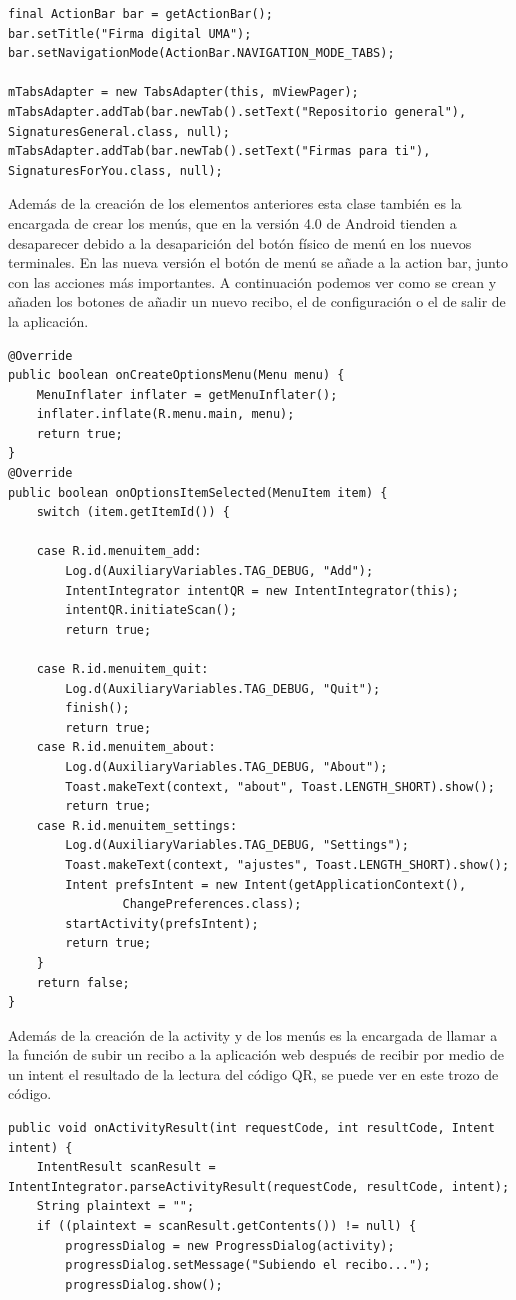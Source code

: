\begin{itemize}
\begin{lstlisting}[style=Java]
final ActionBar bar = getActionBar();
bar.setTitle("Firma digital UMA");
bar.setNavigationMode(ActionBar.NAVIGATION_MODE_TABS);

mTabsAdapter = new TabsAdapter(this, mViewPager);
mTabsAdapter.addTab(bar.newTab().setText("Repositorio general"), SignaturesGeneral.class, null);
mTabsAdapter.addTab(bar.newTab().setText("Firmas para ti"), SignaturesForYou.class, null);
\end{lstlisting}

Además de la creación de los elementos anteriores esta clase también es la encargada de crear los menús, que en la versión 4.0 de Android tienden a desaparecer debido a la desaparición del botón físico de menú en los nuevos terminales. En las nueva versión el botón de menú se añade a la action bar, junto con las acciones más importantes. A continuación podemos ver como se crean y añaden los botones de añadir un nuevo recibo, el de configuración o el de salir de la aplicación.

\begin{lstlisting}[style=Java]
@Override
public boolean onCreateOptionsMenu(Menu menu) {
	MenuInflater inflater = getMenuInflater();
	inflater.inflate(R.menu.main, menu);
	return true;
}
@Override
public boolean onOptionsItemSelected(MenuItem item) {
	switch (item.getItemId()) {

	case R.id.menuitem_add:
		Log.d(AuxiliaryVariables.TAG_DEBUG, "Add");
		IntentIntegrator intentQR = new IntentIntegrator(this);
		intentQR.initiateScan();
		return true;

	case R.id.menuitem_quit:
		Log.d(AuxiliaryVariables.TAG_DEBUG, "Quit");
		finish();
		return true;
	case R.id.menuitem_about:
		Log.d(AuxiliaryVariables.TAG_DEBUG, "About");
		Toast.makeText(context, "about", Toast.LENGTH_SHORT).show();
		return true;
	case R.id.menuitem_settings:
		Log.d(AuxiliaryVariables.TAG_DEBUG, "Settings");
		Toast.makeText(context, "ajustes", Toast.LENGTH_SHORT).show();
		Intent prefsIntent = new Intent(getApplicationContext(),
		        ChangePreferences.class);
		startActivity(prefsIntent);
		return true;
	}
	return false;
}
\end{lstlisting}

Además de la creación de la activity y de los menús es la encargada de llamar a la función de subir un recibo a la aplicación web después de recibir por medio de un intent el resultado de la lectura del código QR, se puede ver en este trozo de código.

\begin{lstlisting}[style=Java]
public void onActivityResult(int requestCode, int resultCode, Intent intent) {
	IntentResult scanResult = IntentIntegrator.parseActivityResult(requestCode, resultCode, intent);
	String plaintext = "";
	if ((plaintext = scanResult.getContents()) != null) {
		progressDialog = new ProgressDialog(activity);
		progressDialog.setMessage("Subiendo el recibo...");
		progressDialog.show();


\end{lstlisting}
\end{itemize}
